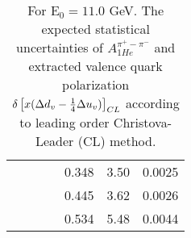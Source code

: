 \begin{table}[htbp]
\begin{center}
\begin{tabular}{|ccccc||c|c|}
         &          &          &          &    0.348 &      3.50 &    0.0025 \\
         &          &          &          &    0.445 &      3.62 &    0.0026 \\
         &          &          &          &    0.534 &      5.48 &    0.0044 \\
\hline
\end{tabular}
\end{center}
\caption{\label{tab:ddv1}  For E$_0=11.0 $ GeV. 
The expected statistical uncertainties of   $A_{1He}^{\pi^+ - \pi^-}$ and  extracted valence quark polarization $\delta \left[x( \Delta d_v -{1 \over 4} \Delta u_v )\right]_{CL}$
according to leading order Christova-Leader (CL) method. 
}
\end{table}
%
%
%
%
